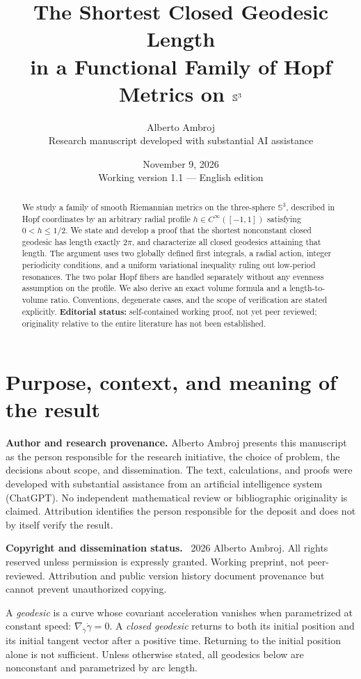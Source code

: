 \documentclass[11pt,a4paper]{article}
\title{\bfseries The Shortest Closed Geodesic Length\\in a Functional Family of Hopf Metrics on $\Sthree$}
\author{Alberto Ambroj\\\small Research manuscript developed with substantial AI assistance}
\date{November 9, 2026\\\small Working version 1.1 --- English edition}
\theoremstyle{remark}\newtheorem{remark}[theorem]{Remark}
\newcommand{\Sthree}{\mathbb S^3}\newcommand{\R}{\mathbb R}\newcommand{\C}{\mathbb C}\newcommand{\Z}{\mathbb Z}
\begin{document}
\maketitle
\begin{abstract}
We study a family of smooth Riemannian metrics on the three-sphere $\Sthree$, described in Hopf coordinates by an arbitrary radial profile $h\in C^\infty([-1,1])$ satisfying $0<h\leq 1/2$. We state and develop a proof that the shortest nonconstant closed geodesic has length exactly $2\pi$, and characterize all closed geodesics attaining that length. The argument uses two globally defined first integrals, a radial action, integer periodicity conditions, and a uniform variational inequality ruling out low-period resonances. The two polar Hopf fibers are handled separately without any evenness assumption on the profile. We also derive an exact volume formula and a length-to-volume ratio. Conventions, degenerate cases, and the scope of verification are stated explicitly. \textbf{Editorial status:} self-contained working proof, not yet peer reviewed; originality relative to the entire literature has not been established.
\end{abstract}
\tableofcontents\newpage
\section{Purpose, context, and meaning of the result}
\textbf{Author and research provenance.} Alberto Ambroj presents this manuscript as the person responsible for the research initiative, the choice of problem, the decisions about scope, and dissemination. The text, calculations, and proofs were developed with substantial assistance from an artificial intelligence system (ChatGPT). No independent mathematical review or bibliographic originality is claimed. Attribution identifies the person responsible for the deposit and does not by itself verify the result.

\textbf{Copyright and dissemination status.} \textcopyright\ 2026 Alberto Ambroj. All rights reserved unless permission is expressly granted. Working preprint, not peer-reviewed. Attribution and public version history document provenance but cannot prevent unauthorized copying.

A \emph{geodesic} is a curve whose covariant acceleration vanishes when parametrized at constant speed: $\nabla_{\dot\gamma}\dot\gamma=0$. A \emph{closed geodesic} returns to both its initial position and its initial tangent vector after a positive time. Returning to the initial position alone is not sufficient. Unless otherwise stated, all geodesics below are nonconstant and parametrized by arc length.
\end{document}
